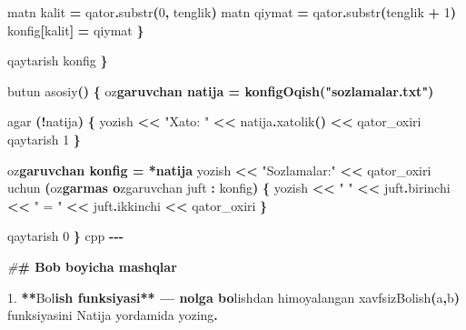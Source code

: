 \documentclass[a4paper,11pt,twoside,openright]{book}
\newenvironment{Shaded}{\begin{snugshade}}{\end{snugshade}}
\newcommand{\CharTok}[1]{\textcolor[rgb]{0.31,0.60,0.02}{#1}}
\newcommand{\DecValTok}[1]{\textcolor[rgb]{0.00,0.00,0.81}{#1}}
\newcommand{\ErrorTok}[1]{\textcolor[rgb]{0.64,0.00,0.00}{\textbf{#1}}}
\newcommand{\FloatTok}[1]{\textcolor[rgb]{0.00,0.00,0.81}{#1}}
\newcommand{\NormalTok}[1]{#1}
\newcommand{\OperatorTok}[1]{\textcolor[rgb]{0.81,0.36,0.00}{\textbf{#1}}}
\newcommand{\PreprocessorTok}[1]{\textcolor[rgb]{0.56,0.35,0.01}{\textit{#1}}}
\newcommand{\StringTok}[1]{\textcolor[rgb]{0.31,0.60,0.02}{#1}}
\begin{document}
\begin{Shaded}
\begin{Highlighting}[]
\NormalTok{        matn kalit }\OperatorTok{=}\NormalTok{ qator}\OperatorTok{.}\NormalTok{substr}\OperatorTok{(}\DecValTok{0}\OperatorTok{,}\NormalTok{ tenglik}\OperatorTok{)}
\NormalTok{        matn qiymat }\OperatorTok{=}\NormalTok{ qator}\OperatorTok{.}\NormalTok{substr}\OperatorTok{(}\NormalTok{tenglik }\OperatorTok{+} \DecValTok{1}\OperatorTok{)}
\NormalTok{        konfig}\OperatorTok{[}\NormalTok{kalit}\OperatorTok{]} \OperatorTok{=}\NormalTok{ qiymat}
    \OperatorTok{\}}

\NormalTok{    qaytarish konfig}
\OperatorTok{\}}

\NormalTok{butun asosiy}\OperatorTok{()} \OperatorTok{\{}
\NormalTok{    o}\CharTok{\textquotesingle{}z}\ErrorTok{garuvchan natija = konfigOqish("sozlamalar.txt")}

\NormalTok{    agar }\OperatorTok{(!}\NormalTok{natija}\OperatorTok{)} \OperatorTok{\{}
\NormalTok{        yozish }\OperatorTok{\textless{}\textless{}} \StringTok{"Xato: "} \OperatorTok{\textless{}\textless{}}\NormalTok{ natija}\OperatorTok{.}\NormalTok{xatolik}\OperatorTok{()} \OperatorTok{\textless{}\textless{}}\NormalTok{ qator\_oxiri}
\NormalTok{        qaytarish }\DecValTok{1}
    \OperatorTok{\}}

\NormalTok{    o}\CharTok{\textquotesingle{}z}\ErrorTok{garuvchan konfig = *natija}
\NormalTok{    yozish }\OperatorTok{\textless{}\textless{}} \StringTok{"Sozlamalar:"} \OperatorTok{\textless{}\textless{}}\NormalTok{ qator\_oxiri}
\NormalTok{    uchun }\OperatorTok{(}\NormalTok{o}\CharTok{\textquotesingle{}z}\ErrorTok{garmas o}\CharTok{\textquotesingle{}}\NormalTok{zgaruvchan juft }\OperatorTok{:}\NormalTok{ konfig}\OperatorTok{)} \OperatorTok{\{}
\NormalTok{        yozish }\OperatorTok{\textless{}\textless{}} \StringTok{"  "} \OperatorTok{\textless{}\textless{}}\NormalTok{ juft}\OperatorTok{.}\NormalTok{birinchi }\OperatorTok{\textless{}\textless{}} \StringTok{" = "} \OperatorTok{\textless{}\textless{}}\NormalTok{ juft}\OperatorTok{.}\NormalTok{ikkinchi }\OperatorTok{\textless{}\textless{}}\NormalTok{ qator\_oxiri}
    \OperatorTok{\}}

\NormalTok{    qaytarish }\DecValTok{0}
\OperatorTok{\}}
\ErrorTok{\textasciigrave{}\textasciigrave{}\textasciigrave{}}\NormalTok{cpp}
\OperatorTok{{-}{-}{-}}

\PreprocessorTok{\#}\ErrorTok{\# Bob bo\textquotesingle{}yicha mashqlar}

\FloatTok{1.} \OperatorTok{**}\NormalTok{Bo}\CharTok{\textquotesingle{}l}\ErrorTok{ish funksiyasi** — nolga bo}\CharTok{\textquotesingle{}}\NormalTok{lishdan himoyalangan }\ErrorTok{\textasciigrave{}}\NormalTok{xavfsizBolish}\OperatorTok{(}\NormalTok{a}\OperatorTok{,}\NormalTok{b}\OperatorTok{)}\ErrorTok{\textasciigrave{}}\NormalTok{ funksiyasini }\ErrorTok{\textasciigrave{}}\NormalTok{Natija}\ErrorTok{\textasciigrave{}}\NormalTok{ yordamida yozing}\OperatorTok{.}


\end{Highlighting}
\end{Shaded}
\end{document}
